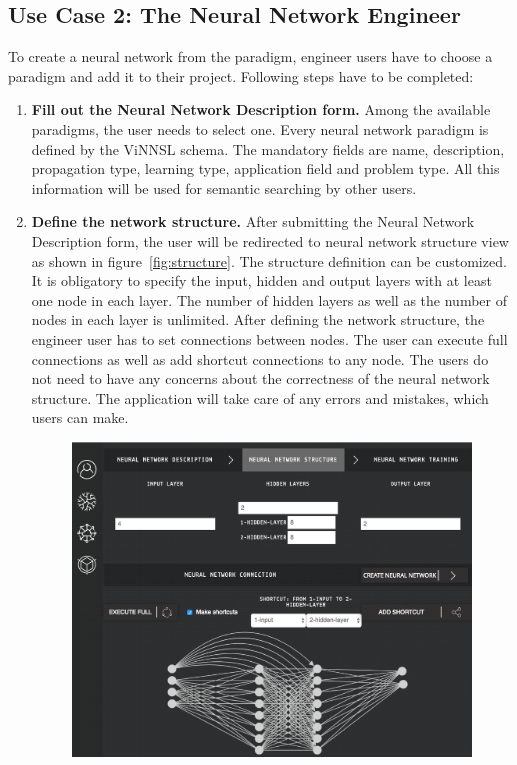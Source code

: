 \documentclass[conference]{IEEEtran}
\begin{document}
 
\subsection{Use Case 2: The Neural Network Engineer}

To create a neural network from the paradigm, engineer users have to choose a paradigm and add it to their project. Following steps have to be completed: 
\begin{enumerate}
\item \textbf{Fill out the Neural Network Description form.} Among the available paradigms, the user needs to select one. Every neural network paradigm is defined by the ViNNSL schema. The mandatory fields are name, description, propagation type, learning type, application field and problem type. All this information will be used for semantic searching by other users.
\item \textbf{Define the network structure.} After submitting the Neural Network Description form, the user will be redirected to neural network structure view as shown in figure~\ref{fig:structure}. The structure definition can be customized. It is obligatory to specify the input, hidden and output layers with at least one node in each layer. The number of hidden layers as well as the number of nodes in each layer is unlimited. After defining the network structure, the engineer user has to set connections between nodes. The user can execute full connections as well as add shortcut connections to any node. The users do not need to have any concerns about the correctness of the neural network structure. The application will take care of any errors and mistakes, which users can make.
\begin{figure}[H]
  \includegraphics[width=\linewidth]{structure.png}

\end{figure}
\end{enumerate}
\end{document}
